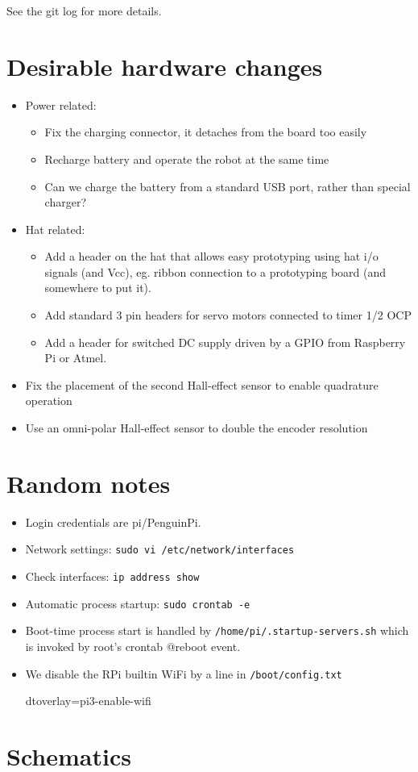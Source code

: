 \documentclass[11pt,fleqn]{article}
\begin{document}
See the git log for more details.  %

\section{Desirable hardware changes}
\begin{itemize}
\item Power related:
 \begin{itemize}
 \item Fix the charging connector, it detaches from the board too easily
 \item Recharge battery and operate the robot at the same time
 \item Can we charge the battery from a standard USB port, rather than special charger?
 \end{itemize}
\item Hat related:
\begin{itemize}
 \item Add a header on the hat that allows easy prototyping using hat i/o signals (and Vcc), eg. ribbon connection to a prototyping board (and somewhere to put it).
 \item Add standard 3 pin headers for servo motors connected to timer 1/2 OCP
 \item Add a header for switched DC supply driven by a GPIO from Raspberry Pi or Atmel.
\end{itemize}
\item Fix the placement of the second Hall-effect sensor to enable quadrature operation
\item Use an omni-polar Hall-effect sensor to double the encoder resolution
\end{itemize}

\section{Random notes}
\begin{itemize}
\item Login credentials are pi/PenguinPi.
\item Network settings: \texttt{sudo vi /etc/network/interfaces}
\item Check interfaces: \texttt{ip address show}
\item Automatic process startup: \texttt{sudo crontab -e}
\item Boot-time process start is handled by \texttt{/home/pi/.startup-servers.sh} which is invoked by root's crontab @reboot event.
\item We disable the RPi builtin WiFi by a line in \texttt{/boot/config.txt}
\begin{Code}
  dtoverlay=pi3-enable-wifi
\end{Code} 
\end{itemize}


\section{Schematics}



\end{document}
